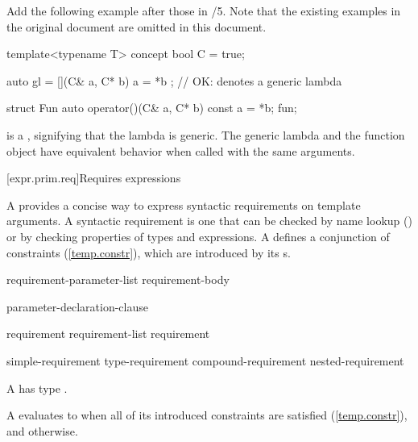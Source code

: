 Add the following example after those in 
/5. Note that
the existing examples in the original document are omitted in this
document.

\setcounter{Paras}{5}
\pnum
\begin{addedblock}
\enterexample
\begin{codeblock}
template<typename T> concept bool C = true;

auto gl = [](C& a, C* b) { a = *b }; // OK: denotes a generic lambda

struct Fun {
    auto operator()(C& a, C* b) const { a = *b; }
} fun;
\end{codeblock}
 is a 
,
signifying that the lambda is generic. The generic lambda 
and the function object  have equivalent behavior when 
called with the same arguments.
\exitexample
\end{addedblock}


[expr.prim.req]{Requires expressions}


\pnum
A  provides a 
concise way to express syntactic requirements on template arguments.
% 
A syntactic requirement is one that can be checked by name lookup 
() or by checking
properties of types and expressions. 
% 
A  defines
a conjunction of constraints (\ref{temp.constr}),
which are introduced by its 
s.

\begin{bnf}
\br
   requirement-parameter-list requirement-body

\br
  \terminal{(} parameter-declaration-clause\opt \terminal{)}

\br

\br
  requirement \terminal{;}\br
  requirement-list requirement

\br
  simple-requirement\br
  type-requirement\br
  compound-requirement\br
  nested-requirement
\end{bnf}

\pnum
A  has type .

\pnum 
A  evaluates to  when all of its
introduced constraints are satisfied (\ref{temp.constr}), and 
otherwise.

